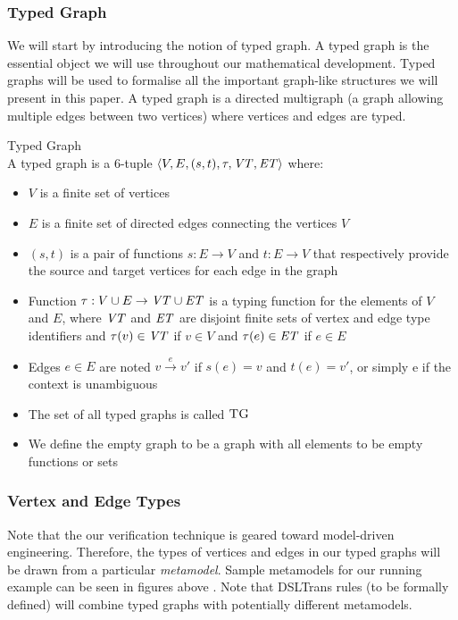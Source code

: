 \subsubsection*{Typed Graph}
We will start by introducing the notion of typed graph. A typed graph is the essential object we will use throughout our mathematical development. Typed graphs will be used to formalise all the important graph-like structures we will present in this paper. A typed graph is a directed multigraph (a graph allowing multiple edges between two vertices) where vertices and edges are typed.


\begin{definition}{Typed Graph\\}
\label{def:typed_graph}
A typed graph is a 6-tuple $\langle V,E,(s,t),\tau, \mathit{VT}, \mathit{ET}\rangle$ where:
\begin{itemize}
\item $V$ is a finite set of vertices
\item $E$ is a finite set of directed edges connecting the vertices $V$
\item $(s,t)$ is a pair of functions $s: E\rightarrow V$ and $t: E\rightarrow V$ that respectively provide the source and target vertices for each edge in the graph
\item Function $\tau:V\cup E\rightarrow \mathit{VT} \cup \mathit{ET}$ is a typing function for the elements of $V$ and $E$, where $\mathit{VT}$ and $\mathit{ET}$ are disjoint finite sets of vertex and edge type identifiers and $\tau(v)\in \mathit{VT}$ if $v\in V$ and $\tau(e)\in \mathit{ET}$ if $e\in E$
\item Edges $e\in E$ are noted $v\xrightarrow{e} v'$ if $s(e)=v$ and $t(e)=v'$, or simply e if the context is unambiguous
\item The set of all typed graphs is called $\textsc{TG}$
\item We define the empty graph to be a graph with all elements to be empty functions or sets
\end{itemize}
\end{definition}


\subsubsection{Vertex and Edge Types}

Note that the our verification technique is geared toward model-driven engineering. Therefore, the types of vertices and edges in our typed graphs will be drawn from a particular \textit{metamodel}. Sample metamodels for our running example can be seen in figures above . Note that DSLTrans rules (to be formally defined) will combine typed graphs with potentially different metamodels.

